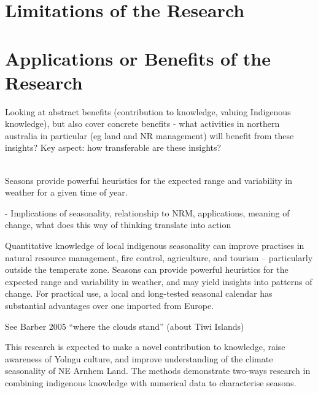\section{Limitations of the Research}
\label{sec:disc-limitations}




\section{Applications or Benefits of the Research}
\label{sec:applications-benefits}
Looking at abstract benefits (contribution to knowledge, valuing Indigenous knowledge),
but also cover concrete benefits - what activities in northern australia
in particular (eg land and NR management) will benefit from these insights?
Key aspect: how transferable are these insights?

~\\

Seasons provide powerful heuristics for the expected range and variability in
weather for a given time of year.

-	Implications of seasonality, relationship to NRM, applications, meaning of
change, what does this way of thinking translate into action


Quantitative knowledge of local indigenous seasonality can improve practises in
natural resource management, fire control, agriculture, and tourism –
particularly outside the temperate zone.  Seasons can provide powerful
heuristics for the expected range and variability in weather, and may yield
insights into patterns of change.  For practical use, a local and long-tested
seasonal calendar has substantial advantages over one imported from Europe.


See Barber 2005 ``where the clouds stand'' (about Tiwi Islands)

This research is expected to make a novel contribution to knowledge, raise
awareness of Yolngu culture, and improve understanding of the climate
seasonality of NE Arnhem Land.  The methods demonstrate two-ways research in
combining indigenous knowledge with numerical data to characterise seasons.

